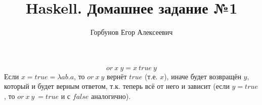

\title{Haskell. Домашнее задание №1}
\author{Горбунов Егор Алексеевич}


\maketitle

\[or\ x\ y = x\ true\ y\]
Если $x = true = \lambda ab.a$, то $or\ x\ y$ вернёт $true$ (т.е. $x$), иначе будет возвращён $y$, который и будет 
верным ответом, т.к. теперь всё от него и зависит (если $y = true$, то $or\ x\ y\ = true$ и с $false$ аналогично).


